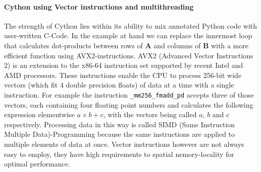 \documentclass[english,11pt,a4paper,table]{article} %
\begin{document}

\paragraph{Cython using Vector instructions and multithreading} The strength of Cython lies within its ability to mix annotated Python code with user-written C-Code. In the example at hand we can replace the innermost loop that calculates dot-products between rows of $\mathbf{A}$ and columns of $\mathbf{B}$ with a more efficient function using AVX2-instructions.
AVX2 (Advanced Vector Instructions 2) is an extension to the x86-64 instruction set supported by recent Intel and AMD processors.
These instructions enable the CPU to process 256-bit wide vectors (which fit 4 double precision floats) of data at a time with a single instruction.
For example the instruction \texttt{\_mm256\_fmadd\_pd} accepts three of those vectors, each containing four floating point numbers and calculates the following expression elementwise $a \times b + c$, with the vectors being called $a$, $b$ and $c$ respectively.
Processing data in this way is called SIMD (Same Instruction Multiple Data)-Programming because the same instructions are applied to multiple elements of data at once.
Vector instructions however are not always easy to employ, they have high requirements to spatial nemory-locality for optimal performance.
\end{document}
